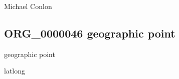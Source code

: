 \documentclass[letterpaper,10pt,english]{sphinxmanual}
\begin{document}
\begin{sphinxShadowBox}

\sphinxAtStartPar
{}
\end{sphinxShadowBox}

\begin{sphinxShadowBox}

\sphinxAtStartPar
Michael Conlon 
\end{sphinxShadowBox}

\begin{sphinxShadowBox}

\sphinxAtStartPar
{}
\end{sphinxShadowBox}
\begin{quote}

\ignorespaces \end{quote}


\subsection{ORG\_0000046 \sphinxhyphen{} geographic point}
\label{\detokenize{doc-ORG_0000046:org-0000046-geographic-point}}\label{\detokenize{doc-ORG_0000046:index-0}}\label{\detokenize{doc-ORG_0000046::doc}}
\begin{sphinxShadowBox}

\sphinxAtStartPar
geographic point
\end{sphinxShadowBox}

\begin{sphinxShadowBox}

\sphinxAtStartPar
latlong
\end{sphinxShadowBox}

\begin{sphinxShadowBox}

\sphinxAtStartPar
{\hyperref[\detokenize{doc-ORG_0000045::doc}]{}}
\end{sphinxShadowBox}
\end{document}
